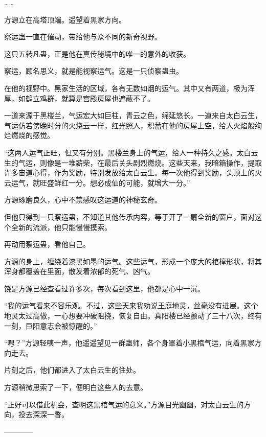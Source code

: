 \begin{this_body}
……

方源立在高塔顶端。遥望着黑家方向。

察运蛊一直在催动，带给他与众不同的新奇视野。

这只五转凡蛊，正是他在真传秘境中的唯一的意外的收获。

察运，顾名思义，就是能视察运气。这是一只侦察蛊虫。

在他的视野中。黑家生活的区域，各有无数如烟的运气。其中又有两道，极为浑厚，如鹤立鸡群，就算是宫殿房屋也遮蔽不了。

一道来源于黑楼兰，气运宏大如巨柱，青云之色，绵延悠长。一道来自太白云生，气运仿若傍晚时分的火烧云一样，红光照人，积蓄在他的房屋上空，给人火焰般绚烂燃烧的感觉。

“这两人运气正旺，但又有分别。黑楼兰身上的气运，给人一种持久之感。太白云生的气运，则像是一堆薪柴，在最后关头剧烈燃烧。这些天来，我暗箱操作，提取许多宙道心得，作为奖励，特别发放给太白云生。每一次他得到奖励，头顶上的火云运气，就旺盛鲜红一分。想必成仙的可能，就增大一分。”

方源琢磨良久，心中不禁感叹这运道的神秘玄奇。

但他只得到一只察运蛊，不知道其他传承内容，等于开了一扇全新的窗户，面对这个全新的流派，他只能慢慢摸索。

再动用察运蛊，看他自己。

方源的身上，缠绕着漆黑如墨的运气。这些运气，形成一个庞大的棺椁形状，将其浑身都覆盖在里面，散发着浓郁的死气、凶气。

饶是方源已经查看过许多次，每次看到这里，他都是心中一沉。

“我的运气看来不容乐观。不过，这些天来我劝说王庭地灵，丝毫没有进展。这个地灵太过高傲，一心想要冲破阻挠，恢复自由。真阳楼已经颤动了三十八次，终有一刻，巨阳意志会被惊醒的。”

“嗯？”方源轻咦一声，他遥遥望见一群蛊师，各个身罩着小黑棺气运，向着黑家方向走去。

片刻之后，他们都进入了太白云生的住处。

方源稍微思索了一下，便明白这些人的去意。

“正好可以借此机会，查明这黑棺气运的意义。”方源目光幽幽，对太白云生的方向，投去深深一瞥。

------------

\end{this_body}

